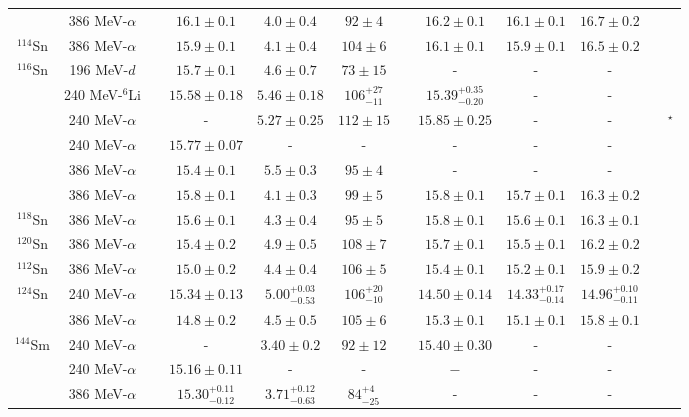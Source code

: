 \begin{table}[t!]
{\begin{tabular}{@{}cccccccccc@{}cc}
  & 386 MeV-$\alpha$ & & $16.1\pm0.1$ & $4.0\pm0.4$ & $92\pm4$ & & $16.2\pm0.1$ & $16.1\pm0.1$ & $16.7\pm0.2$ & & \cite{Li_2010} \\
$^{114}$Sn & 386 MeV-$\alpha$ & & $15.9\pm0.1$ & $4.1\pm0.4$ & $104\pm6$ & & $16.1\pm0.1$ & $15.9\pm0.1$ & $16.5\pm0.2$ & & \cite{Li_2010} \\
$^{116}$Sn & 196 MeV-$d$ & & $15.7\pm0.1$ & $4.6\pm0.7$ & $73\pm15$ & & - & - & - & & \cite{Darshana2015} \\
  & 240 MeV-$^{6}$Li & & $15.58\pm0.18$ & $5.46\pm0.18$ & ${106}^{+27}_{-11}$ & & ${15.39}^{+0.35}_{-0.20}$ & - & - & & \cite{DHY2009_Sn} \\
  & 240 MeV-$\alpha$ & & - & $5.27\pm0.25$ & $112\pm15$ & & $15.85\pm0.25$ & - & - & & \cite{dhybg}$^\star$ \\
  & 240 MeV-$\alpha$ & & $15.77\pm0.07$ & - & - & & - & - & - & & \cite{dhyprl} \\
  & 386 MeV-$\alpha$ & & $15.4\pm0.1$ & $5.5\pm0.3$ & $95\pm4$ & & - & - & - & & \cite{Uchida_90Zr} \\
  & 386 MeV-$\alpha$ & & $15.8\pm0.1$ & $4.1\pm0.3$ & $99\pm5$ & & $15.8\pm0.1$ & $15.7\pm0.1$ & $16.3\pm0.2$ & & \cite{Li_2010} \\
$^{118}$Sn & 386 MeV-$\alpha$ & & $15.6\pm0.1$ & $4.3\pm0.4$ & $95\pm5$ & & $15.8\pm0.1$ & $15.6\pm0.1$ & $16.3\pm0.1$ & & \cite{Li_2010} \\
$^{120}$Sn & 386 MeV-$\alpha$ & & $15.4\pm0.2$ & $4.9\pm0.5$ & $108\pm7$ & & $15.7\pm0.1$ & $15.5\pm0.1$ & $16.2\pm0.2$ & & \cite{Li_2010} \\
$^{112}$Sn & 386 MeV-$\alpha$ & & $15.0\pm0.2$ & $4.4\pm0.4$ & $106\pm5$ & & $15.4\pm0.1$ & $15.2\pm0.1$ & $15.9\pm0.2$ & & \cite{Li_2010} \\
$^{124}$Sn & 240 MeV-$\alpha$ & & $15.34\pm0.13$ & ${5.00}^{+0.03}_{-0.53}$ & ${106}^{+20}_{-10}$ & & $14.50\pm0.14$ & ${14.33}^{+0.17}_{-0.14}$ & ${14.96}^{+0.10}_{-0.11}$ & & \cite{DHY2004_Sn} \\
  & 386 MeV-$\alpha$ & & $14.8\pm0.2$ & $4.5\pm0.5$ & $105\pm6$ & & $15.3\pm0.1$ & $15.1\pm0.1$ & $15.8\pm0.1$ & & \cite{Li_2010} \\
$^{144}$Sm & 240 MeV-$\alpha$ & & - & $3.40\pm0.2$ & $92\pm12$ & & $15.40\pm0.30$ & - & - & & \cite{dhybg} \\
  & 240 MeV-$\alpha$ & & $15.16\pm0.11$ & - & - & & $-$ & - & - & & \cite{dhyprl} \\
  & 386 MeV-$\alpha$ & & ${15.30}^{+0.11}_{-0.12}$& ${3.71}^{+0.12}_{-0.63}$ & ${84}^{+4}_{-25}$ & & - & - & - & & \cite{Itoh_prc2003} \\

\end{tabular}}
\end{table}
